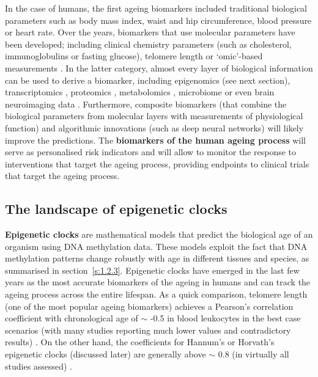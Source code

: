 In the case of humans, the first ageing biomarkers included traditional biological parameters such as body mass index, waist and hip circumference, blood pressure or heart rate. Over the years, biomarkers that use molecular parameters have been developed; including clinical chemistry parameters (such as cholesterol, immunoglobulins or fasting glucose), telomere length or `omic'-based measurements \cite{Burkle2015a,Jylhava2017}. In the latter category, almost every layer of biological information can be used to derive a biomarker, including epigenomics (see next section), transcriptomics \cite{Peters2015a}, proteomics \cite{Tanaka2018}, metabolomics \cite{Hertel2016}, microbiome \cite{Galkin2018} or even brain neuroimaging data \cite{Cole2017a}. Furthermore, composite biomarkers (that combine the biological parameters from molecular layers with measurements of physiological function) \cite{Khan2017} and algorithmic innovations (such as deep neural networks) \cite{Putin2016} will likely improve the predictions. The \textbf{biomarkers of the human ageing process} will serve as personalised risk indicators and will allow to monitor the response to interventions that target the ageing process, providing endpoints to clinical trials that target the ageing process.

\smallskip

\subsection{The landscape of epigenetic clocks}

\smallskip

\textbf{Epigenetic clocks} are mathematical models that predict the biological age of an organism using DNA methylation data. These models exploit the fact that DNA methylation patterns change robustly with age in different tissues and species, as summarised in section~\ref{s:1.2.3}. Epigenetic clocks have emerged in the last few years as the most accurate biomarkers of the ageing in humans and can track the ageing process across the entire lifespan. As a quick comparison, telomere length (one of the most popular ageing biomarkers) achieves a Pearson's correlation coefficient with chronological age of $\sim$ -0.5 in blood leukocytes in the best case scenarios (with many studies reporting much lower values and contradictory results) \cite{Newman2013}. On the other hand, the coefficients for Hannum's or Horvath's epigenetic clocks (discussed later) are generally above $\sim$ 0.8 (in virtually all studies assessed) \cite{Chen2016}.

